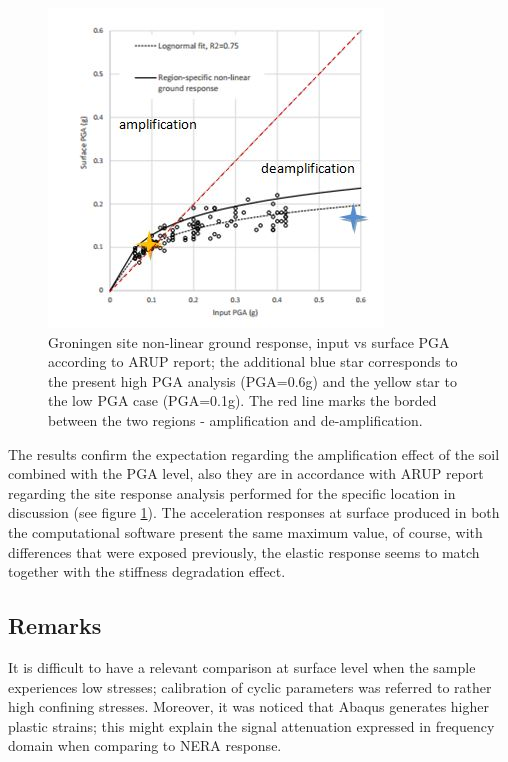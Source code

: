 	\begin{figure}[!h]
		\centering
		\includegraphics[width=0.7\linewidth]{"ARUP"}
		\caption{Groningen site non-linear ground response, input vs surface PGA according to ARUP report; the additional blue star corresponds to the present high PGA analysis (PGA=0.6g) and the yellow star to the low PGA case (PGA=0.1g). The red line marks the borded between the two regions - amplification and de-amplification.}
		\label{ARUP}
	\end{figure}
	
	The results confirm the expectation regarding the amplification effect of the soil combined with the PGA level, also they are in accordance with ARUP report regarding the site response analysis performed for the specific location in discussion (see figure \ref{ARUP}). The acceleration responses at surface produced in both the computational software present the same maximum value, of course, with differences that were exposed previously, the elastic response seems to match together with the stiffness degradation effect. 
	\pagebreak
	
	
	\newpage
	\subsection{Remarks}
	It is difficult to have a relevant comparison at surface level when the sample experiences low stresses; calibration of cyclic parameters was referred to rather high confining stresses. Moreover, it was noticed that Abaqus generates higher plastic strains; this might explain the signal attenuation expressed in frequency domain when comparing to NERA response. 
	
